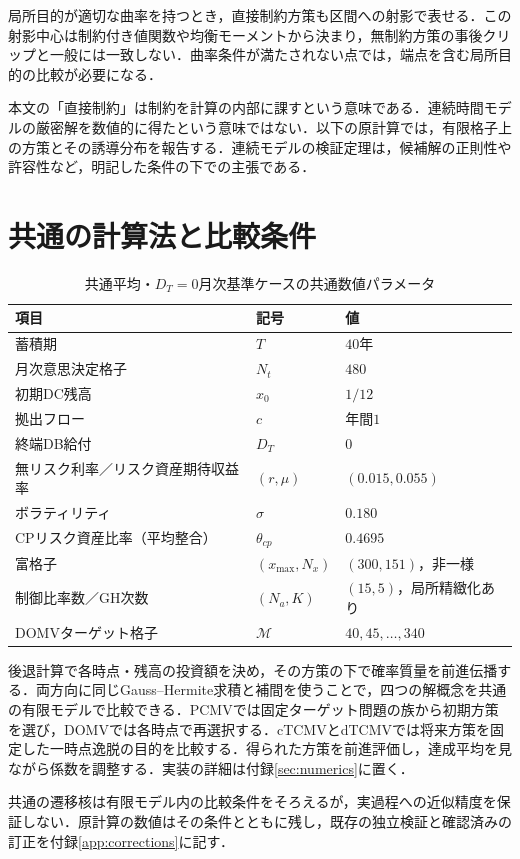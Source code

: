 \documentclass[10pt,a4paper]{article}
\theoremstyle{plain}
\theoremstyle{definition}
\begin{document}
局所目的が適切な曲率を持つとき，直接制約方策も区間への射影で表せる．この射影中心は制約付き値関数や均衡モーメントから決まり，無制約方策の事後クリップと一般には一致しない．曲率条件が満たされない点では，端点を含む局所目的の比較が必要になる．

本文の「直接制約」は制約を計算の内部に課すという意味である．連続時間モデルの厳密解を数値的に得たという意味ではない．以下の原計算では，有限格子上の方策とその誘導分布を報告する．連続モデルの検証定理は，候補解の正則性や許容性など，明記した条件の下での主張である．
\section{共通の計算法と比較条件}\label{sec:method-main}
\begin{table}[htbp]
\centering
\caption{共通平均・$D_T=0$月次基準ケースの共通数値パラメータ}
\label{tab:all-strategy-params}
\begin{tabular}{lll}
\toprule
項目 & 記号 & 値 \\
\midrule
蓄積期 & $T$ & $40$年 \\
月次意思決定格子 & $N_t$ & $480$ \\
初期DC残高 & $x_0$ & $1/12$ \\
拠出フロー & $c$ & 年間$1$ \\
終端DB給付 & $D_T$ & $0$ \\
無リスク利率／リスク資産期待収益率 & $(r,\mu)$ & $(0.015,0.055)$ \\
ボラティリティ & $\sigma$ & $0.180$ \\
CPリスク資産比率（平均整合） & $\theta_{cp}$ & $0.4695$ \\
富格子 & $(x_{\max},N_x)$ & $(300,151)$，非一様 \\
制御比率数／GH次数 & $(N_a,K)$ & $(15,5)$，局所精緻化あり \\
DOMVターゲット格子 & $\mathcal M$ & $40,45,\ldots,340$ \\
\bottomrule
\end{tabular}
\end{table}
後退計算で各時点・残高の投資額を決め，その方策の下で確率質量を前進伝播する．両方向に同じGauss--Hermite求積と補間を使うことで，四つの解概念を共通の有限モデルで比較できる．PCMVでは固定ターゲット問題の族から初期方策を選び，DOMVでは各時点で再選択する．cTCMVとdTCMVでは将来方策を固定した一時点逸脱の目的を比較する．得られた方策を前進評価し，達成平均を見ながら係数を調整する．実装の詳細は付録\ref{sec:numerics}に置く．

共通の遷移核は有限モデル内の比較条件をそろえるが，実過程への近似精度を保証しない．原計算の数値はその条件とともに残し，既存の独立検証と確認済みの訂正を付録\ref{app:corrections}に記す．
\end{document}
